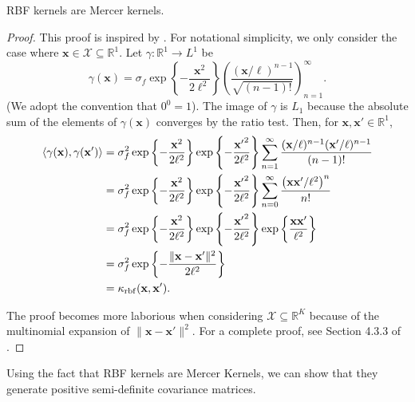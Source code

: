 \begin{theorem}
    \label{thm:rbf-mercer}
    RBF kernels are Mercer kernels.
\end{theorem}
\begin{proof}
    This proof is inspired by \cite{shashua2009}.
    For notational simplicity, we only consider the case where $\mathbf{x} \in \mathcal{X} \subseteq \mathbb{R}^{1}$.
    Let $\gamma : \mathbb{R}^{1} \to L^1$ be
    \begin{equation*}
        \gamma(\mathbf{x}) = \sigma_f \exp\left\{- \frac{\mathbf{x}^2}{2\ell^2}\right\} \left(\frac{ (\mathbf{x} / \ell)^{n - 1} }{ \sqrt{(n - 1)!} }\right)_{n=1}^{\infty}.
    \end{equation*}
    (We adopt the convention that $0^0 = 1$).
    The image of $\gamma$ is $L_1$ because the absolute sum of the elements of $\gamma(\mathbf{x})$ converges by the ratio test.
    Then, for $\mathbf{x}, \mathbf{x'} \in \mathbb{R}^{1}$,
    \begin{align*}
        \langle \gamma(\mathbf{x}), \gamma(\mathbf{x'}) \rangle
        & = \sigma_f^2
        \exp \left\{ -\frac{\mathbf{x}^2}{2\ell^2} \right\}
        \exp \left\{ -\frac{ \mathbf{x'}^2}{2\ell^2} \right\}
        \sum\limits_{n=1}^{\infty}
        \frac{ (\mathbf{x}/\ell)^{n - 1} (\mathbf{x'}/\ell)^{n - 1}}{ (n - 1)! } \\
        & = \sigma_f^2
        \exp \left\{ -\frac{\mathbf{x}^2}{2\ell^2} \right\}
        \exp \left\{ -\frac{ \mathbf{x'}^2}{2\ell^2} \right\}
        \sum\limits_{n=0}^{\infty}
        \frac{ \left(\mathbf{x}\mathbf{x'}/\ell^2\right)^{n }}{ n ! } \\
        & = \sigma_f^2
        \exp \left\{ -\frac{ \mathbf{x}^2}{2\ell^2} \right\}
        \exp \left\{ -\frac{ \mathbf{x'}^2}{2\ell^2} \right\}
        \exp \left\{ \frac{\mathbf{x} \mathbf{x'}}{ \ell^2} \right\} \\
        & = \sigma_f^2 \exp \left\{ -\frac{ \lVert \mathbf{x} - \mathbf{x'} \rVert^2 }{ 2\ell^2 } \right\} \\
        & = \kappa_{\mathrm{rbf}}(\mathbf{x}, \mathbf{x'}).
    \end{align*}

    The proof becomes more laborious when considering $\mathcal{X} \subseteq \mathbb{R}^{K}$ because of the multinomial expansion of $\lVert \mathbf{x} - \mathbf{x}' \rVert^2$.
    For a complete proof, see Section 4.3.3 of \cite{shashua2009}.
\end{proof}

Using the fact that RBF kernels are Mercer Kernels, we can show that they generate positive semi-definite covariance matrices.

